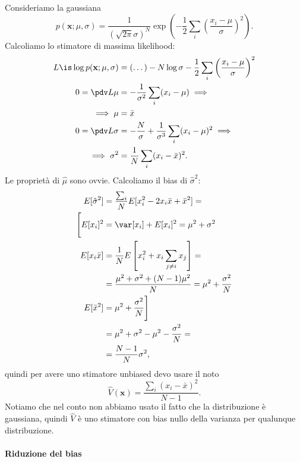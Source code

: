 \begin{example}
	Consideriamo la gaussiana
	\begin{equation*}
		p(\mathbf x;\mu,\sigma)
		= \frac1{(\sqrt{2\pi}\sigma)^N} \exp \left( -\frac12\sum_i\left(\frac{x_i-\mu}\sigma\right)^2 \right).
	\end{equation*}
	Calcoliamo lo stimatore di massima likelihood:
	\begin{align*}
		L \is \log p(\mathbf x;\mu,\sigma)
		&= (\dots) - N\log\sigma - \frac12 \sum_i \left( \frac{x_i-\mu}\sigma \right)^2 \\
		0 = \pdv L\mu
		&= -\frac1{\sigma^2}\sum_i (x_i-\mu) \implies \\
		\implies \mu
		&= \bar x \\
		0 = \pdv L\sigma
		&= -\frac N\sigma + \frac1{\sigma^3}\sum_i (x_i-\mu)^2 \implies \\
		\implies \sigma^2
		&= \frac1N \sum_i (x_i-\bar x)^2.
	\end{align*}
	Le proprietà di $\hat\mu$ sono ovvie.
	Calcoliamo il bias di $\hat\sigma^2$:
	\begin{align*}
		E[\hat\sigma^2]
		&= \frac{\sum_i}N E[x_i^2 - 2x_i\bar x + \bar x^2] = \\
		\Bigg[ E[x_i]^2
		&= \var[x_i] + E[x_i]^2
		= \mu^2 + \sigma^2 \\
		E[x_i\bar x]
		&= \frac 1N E \left[ x_i^2 + x_i \sum_{j\neq i} x_j \right] = \\
		&= \frac{\mu^2 + \sigma^2 + (N-1)\mu^2}N
		= \mu^2 + \frac{\sigma^2}N \\
		E[\bar x^2]
		&= \mu^2 + \frac{\sigma^2}N \Bigg] \\
		&= \mu^2 + \sigma^2 - \mu^2 - \frac{\sigma^2}N = \\
		&= \frac{N-1}N \sigma^2,
	\end{align*}
	quindi per avere uno stimatore unbiased devo usare il noto
	\begin{equation*}
		\hat V(\mathbf x)
		= \frac{\sum_i (x_i-\bar x)^2}{N-1}.
	\end{equation*}
	Notiamo che nel conto non abbiamo usato il fatto che la distribuzione è gaussiana,
	quindi $\hat V$ è uno stimatore con bias nullo della varianza per qualunque distribuzione.
\end{example}

\paragraph{Riduzione del bias}

